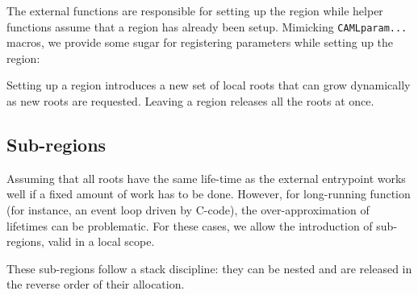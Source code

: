 \documentclass[a4paper]{easychair}
\begin{document}
The external functions are responsible for setting up the region while
helper functions assume that a region has already been setup. Mimicking
\texttt{CAMLparam...} macros, we provide some sugar for registering
parameters while setting up the region:

\begin{Shaded}
\begin{Highlighting}[]
\NormalTok{\{}
\NormalTok{, }\NormalTok{);}
\NormalTok{\}}

\NormalTok{\{}
\NormalTok{\}}

\NormalTok{\{}
\NormalTok{\}}
\end{Highlighting}
\end{Shaded}

Setting up a region introduces a new set of local roots that can grow
dynamically as new roots are requested. Leaving a region releases all
the roots at once.

\hypertarget{sub-regions}{%
\subsection{Sub-regions}\label{sub-regions}}

Assuming that all roots have the same life-time as the external
entrypoint works well if a fixed amount of work has to be done. However,
for long-running function (for instance, an event loop driven by
C-code), the over-approximation of lifetimes can be problematic. For
these cases, we allow the introduction of sub-regions, valid in a local
scope.

These sub-regions follow a stack discipline: they can be nested and are
released in the reverse order of their allocation.

\begin{Shaded}
\begin{Highlighting}[]
\end{Highlighting}
\end{Shaded}
\end{document}

